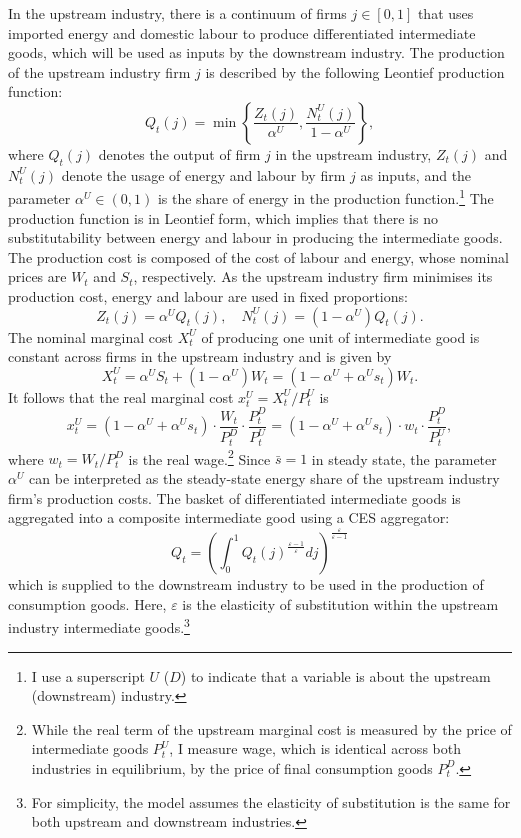 \documentclass[a4paper, 12pt]{article}
\theoremstyle{definition*}
\begin{document}
In the upstream industry, there is a continuum of firms $j \in [0,1]$ that uses imported energy and domestic labour to produce differentiated intermediate goods, which will be used as inputs by the downstream industry.
The production of the upstream industry firm $j$ is described by the following Leontief production function:
\begin{equation}
  Q_t(j) = \min\left\{\frac{Z_t(j)}{\alpha^U}, \frac{N^U_t(j)}{1 - \alpha^U}\right\},
\end{equation}
where $Q_t(j)$ denotes the output of firm $j$ in the upstream industry, $Z_t(j)$ and $N^U_t(j)$ denote the usage of energy and labour by firm $j$ as inputs, and the parameter $\alpha^U \in (0,1)$ is the share of energy in the production function.\footnote{I use a superscript $U$ ($D$) to indicate that a variable is about the upstream (downstream) industry.}
The production function is in Leontief form, which implies that there is no substitutability between energy and labour in producing the intermediate goods.
The production cost is composed of the cost of labour and energy, whose nominal prices are $W_t$ and $S_t$, respectively.
As the upstream industry firm minimises its production cost, energy and labour are used in fixed proportions:
\begin{equation}
  Z_t(j) = \alpha^U Q_t(j), \quad N^U_t(j) = (1 - \alpha^U)Q_t(j).
\end{equation}
The nominal marginal cost $X^U_t$ of producing one unit of intermediate good is constant across firms in the upstream industry and is given by
\begin{equation}\label{eq:nmcU}
  X^U_t = \alpha^U S_t + (1 - \alpha^U)W_t = (1 - \alpha^U + \alpha^U s_t)W_t.
\end{equation}
It follows that the real marginal cost $x^U_t = X^U_t / P^U_t$ is
\begin{equation}
  x^U_t = \left(1 - \alpha^U + \alpha^Us_t\right)\cdot\frac{W_t}{P^D_t}\cdot\frac{P^D_t}{P^U_t} = (1 - \alpha^U + \alpha^U s_t)\cdot w_t\cdot\frac{P^D_t}{P^U_t},
\end{equation}
where $w_t = W_t / P^D_t$ is the real wage.\footnote{While the real term of the upstream marginal cost is measured by the price of intermediate goods $P^U_t$, I measure wage, which is identical across both industries in equilibrium, by the price of final consumption goods $P^D_t$.}
Since $\bar s = 1$ in steady state, the parameter $\alpha^U$ can be interpreted as the steady-state energy share of the upstream industry firm's production costs.
The basket of differentiated intermediate goods is aggregated into a composite intermediate good using a CES aggregator:
\begin{equation}
  Q_t = \left(\int_0^1 Q_t(j)^{\frac{\varepsilon - 1}{\varepsilon}} dj\right)^{\frac{\varepsilon}{\varepsilon - 1}}
\end{equation}
which is supplied to the downstream industry to be used in the production of consumption goods.
Here, $\varepsilon$ is the elasticity of substitution within the upstream industry intermediate goods.\footnote{For simplicity, the model assumes the elasticity of substitution is the same for both upstream and downstream industries.}
\end{document}
